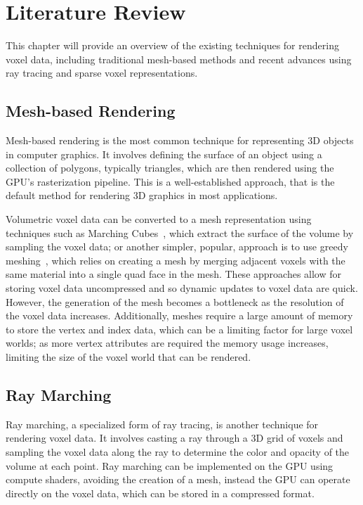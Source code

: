 \documentclass{article}
\begin{document}
\section{Literature Review}
This chapter will provide an overview of the existing techniques for rendering voxel data, including traditional mesh-based methods and recent advances using ray tracing and sparse voxel representations.

\subsection{Mesh-based Rendering}
Mesh-based rendering is the most common technique for representing 3D objects in computer graphics. It involves defining the surface of an object using a collection of polygons, typically triangles, which are then rendered using the GPU's rasterization pipeline. This is a well-established approach, that is the default method for rendering 3D graphics in most applications.

Volumetric voxel data can be converted to a mesh representation using techniques such as Marching Cubes~\cite{Amran_1998}, which extract the surface of the volume by sampling the voxel data; or another simpler, popular, approach is to use greedy meshing~\cite{mikolalysenko_2012}, which relies on creating a mesh by merging adjacent voxels with the same material into a single quad face in the mesh. These approaches allow for storing voxel data uncompressed and so dynamic updates to voxel data are quick. However, the generation of the mesh becomes a bottleneck as the resolution of the voxel data increases. Additionally, meshes require a large amount of memory to store the vertex and index data, which can be a limiting factor for large voxel worlds; as more vertex attributes are required the memory usage increases, limiting the size of the voxel world that can be rendered.

\subsection{Ray Marching}
Ray marching, a specialized form of ray tracing, is another technique for rendering voxel data. It involves casting a ray through a 3D grid of voxels and sampling the voxel data along the ray to determine the color and opacity of the volume at each point. Ray marching can be implemented on the GPU using compute shaders, avoiding the creation of a mesh, instead the GPU can operate directly on the voxel data, which can be stored in a compressed format.
\end{document}
